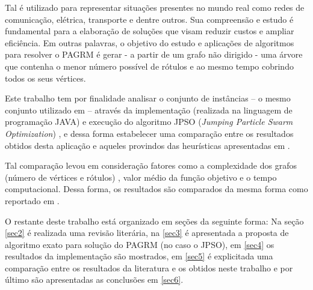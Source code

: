 \documentclass{sig-alternate-05-2015}
\begin{document}
Tal é utilizado para representar situações presentes no mundo real como redes de comunicação, elétrica, transporte e dentre outros. Sua compreensão e estudo é fundamental para a elaboração de soluções que visam reduzir custos e ampliar eficiência. Em outras palavras, o objetivo do estudo e aplicações de algoritmos para resolver o PAGRM é gerar - a partir de um grafo não dirigido - uma árvore que contenha o menor número possível de rótulos e ao mesmo tempo cobrindo todos os seus vértices.

Este trabalho tem por finalidade analisar o conjunto de instâncias  -- o mesmo conjunto utilizado em \cite{consoli2009greedy} -- através da implementação (realizada na linguagem de programação JAVA) e execução do algoritmo JPSO (\textit{Jumping Particle Swarm Optimization}) \cite{consoli2008discrete}, e dessa forma estabelecer uma comparação entre os resultados obtidos desta aplicação e aqueles provindos das heurísticas apresentadas em \cite{consoli2009greedy}. 

Tal comparação levou em consideração fatores como a complexidade dos grafos (número de vértices e rótulos) , valor médio da função objetivo e o tempo computacional. Dessa forma, os resultados são comparados da mesma forma como reportado em \cite{consoli2009greedy}.

O restante deste trabalho está organizado em seções da seguinte forma: Na seção \ref{sec2} é realizada uma revisão literária, na \ref{sec3} é apresentada a proposta de algoritmo exato para solução do PAGRM (no caso o JPSO), em \ref{sec4} os resultados da implementação são mostrados, em \ref{sec5} é explicitada uma comparação entre os resultados da literatura e os obtidos neste trabalho e por último são apresentadas as conclusões em \ref{sec6}.
\end{document}
